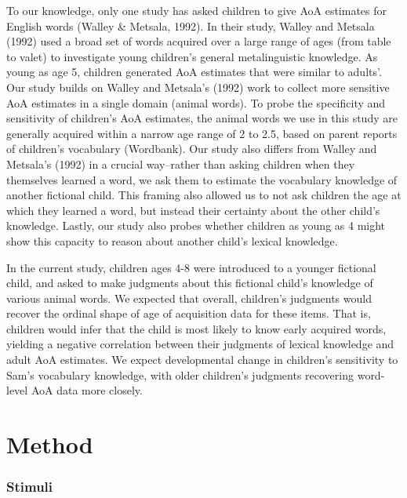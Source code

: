 \documentclass[10pt, letterpaper]{article}
\begin{document}
To our knowledge, only one study has asked children to give AoA
estimates for English words (Walley \& Metsala, 1992). In their study,
Walley and Metsala (1992) used a broad set of words acquired over a
large range of ages (from table to valet) to investigate young
children's general metalinguistic knowledge. As young as age 5, children
generated AoA estimates that were similar to adults'. Our study builds
on Walley and Metsala's (1992) work to collect more sensitive AoA
estimates in a single domain (animal words). To probe the specificity
and sensitivity of children's AoA estimates, the animal words we use in
this study are generally acquired within a narrow age range of 2 to 2.5,
based on parent reports of children's vocabulary (Wordbank). Our study
also differs from Walley and Metsala's (1992) in a crucial way--rather
than asking children when they themselves learned a word, we ask them to
estimate the vocabulary knowledge of another fictional child. This
framing also allowed us to not ask children the age at which they
learned a word, but instead their certainty about the other child's
knowledge. Lastly, our study also probes whether children as young as 4
might show this capacity to reason about another child's lexical
knowledge.

In the current study, children ages 4-8 were introduced to a younger
fictional child, and asked to make judgments about this fictional
child's knowledge of various animal words. We expected that overall,
children's judgments would recover the ordinal shape of age of
acquisition data for these items. That is, children would infer that the
child is most likely to know early acquired words, yielding a negative
correlation between their judgments of lexical knowledge and adult AoA
estimates. We expect developmental change in children's sensitivity to
Sam's vocabulary knowledge, with older children's judgments recovering
word-level AoA data more closely.

\hypertarget{method}{%
\section{Method}\label{method}}

\hypertarget{stimuli}{%
\subsubsection{Stimuli}\label{stimuli}}
\end{document}
